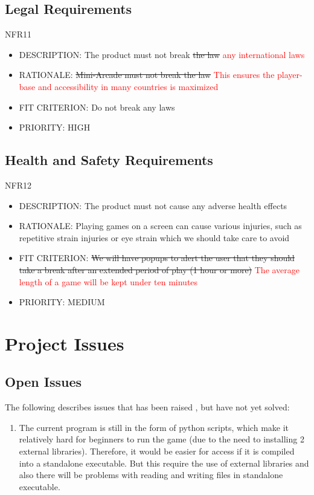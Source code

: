\documentclass[12pt, titlepage]{article}
\begin{document}
\subsection{Legal Requirements}
NFR11
\begin{itemize}
    \item DESCRIPTION: The product must not break \sout{the law} \textcolor{red}{any international laws}
    \item RATIONALE: \sout{Mini-Arcade must not break the law} \textcolor{red}{This ensures the player-base and accessibility in many countries is maximized}
    \item FIT CRITERION: Do not break any laws
    \item PRIORITY: HIGH
\end{itemize}

\subsection{Health and Safety Requirements}
NFR12
\begin{itemize}
    \item DESCRIPTION: The product must not cause any adverse health effects
    \item RATIONALE: Playing games on a screen can cause various injuries, such as repetitive strain injuries
or eye strain which we should take care to avoid
    \item FIT CRITERION: \sout{We will have popups to alert the user that they should take a 
break after an extended period of play (1 hour or more)} \textcolor{red}{The average length of a game will be kept under ten minutes}
    \item PRIORITY: MEDIUM
\end{itemize}

\section{Project Issues}

\subsection{Open Issues}

The following describes issues that has been raised , but have not yet solved:
\begin{enumerate}
    \item The current program is still in the form of python scripts, which make it relatively hard for beginners to run the game (due to the need to installing 2 external libraries). Therefore, it would be easier for access if it is compiled into a standalone executable. But this require the use of external libraries and also there will be problems with reading and writing files in standalone executable.
\end{enumerate}
\end{document}
